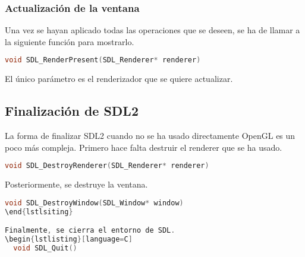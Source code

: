 \subsubsection{Actualización de la ventana}
Una vez se hayan aplicado todas las operaciones que se deseen, se ha de llamar a la siguiente función para mostrarlo.
\begin{lstlisting}[language=C]
  void SDL_RenderPresent(SDL_Renderer* renderer)
\end{lstlisting}
El único parámetro es el renderizador que se quiere actualizar.
\newpage

\subsection{Finalización de SDL2}
La forma de finalizar SDL2 cuando no se ha usado directamente OpenGL es un poco más compleja.
Primero hace falta destruir el renderer que se ha usado.
\begin{lstlisting}[language=C]
  void SDL_DestroyRenderer(SDL_Renderer* renderer)
\end{lstlisting}
Posteriormente, se destruye la ventana.
\begin{lstlisting}[language=C]
  void SDL_DestroyWindow(SDL_Window* window)
\end{lstlsiting}

Finalmente, se cierra el entorno de SDL.
\begin{lstlisting}[language=C]
  void SDL_Quit()
\end{lstlisting}
